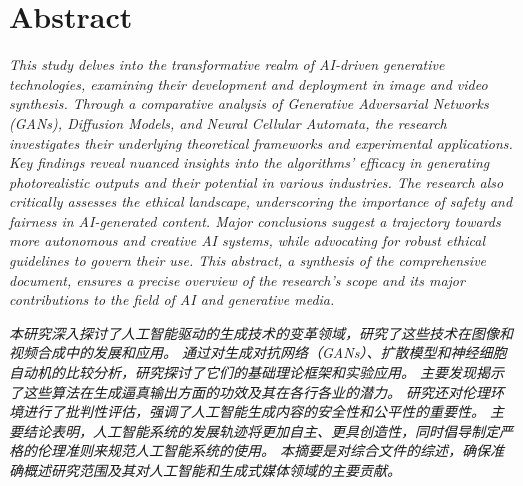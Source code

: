 \documentclass[11pt,a4paper,oneside]{report}
\newcommand{\instructions}[1]{{\color{black}\itshape #1}}
\begin{document}

\clearpage
{}


\setcounter{tocdepth}{0} %
\tableofcontents


\chapter*{Abstract}


\instructions{This study delves into the transformative realm of AI-driven generative technologies, 
examining their development and deployment in image and video synthesis. 
Through a comparative analysis of Generative Adversarial Networks (GANs), 
Diffusion Models, and Neural Cellular Automata, the research investigates their underlying theoretical frameworks and experimental applications. 
Key findings reveal nuanced insights into the algorithms' efficacy in generating photorealistic outputs and their potential in various industries. 
The research also critically assesses the ethical landscape, underscoring the importance of safety and fairness in AI-generated content. 
Major conclusions suggest a trajectory towards more autonomous and creative AI systems, while advocating for robust ethical guidelines to govern their use. 
This abstract, a synthesis of the comprehensive document, ensures a precise overview of the research's scope and its major contributions to the field of AI and generative media.}

\vspace{4\bigskipamount}


\instructions{本研究深入探讨了人工智能驱动的生成技术的变革领域，研究了这些技术在图像和视频合成中的发展和应用。
通过对生成对抗网络（GANs）、扩散模型和神经细胞自动机的比较分析，研究探讨了它们的基础理论框架和实验应用。
主要发现揭示了这些算法在生成逼真输出方面的功效及其在各行各业的潜力。
研究还对伦理环境进行了批判性评估，强调了人工智能生成内容的安全性和公平性的重要性。
主要结论表明，人工智能系统的发展轨迹将更加自主、更具创造性，同时倡导制定严格的伦理准则来规范人工智能系统的使用。
本摘要是对综合文件的综述，确保准确概述研究范围及其对人工智能和生成式媒体领域的主要贡献。}
\end{document}
